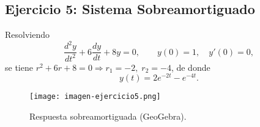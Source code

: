 \subsection{Ejercicio 5: Sistema Sobreamortiguado}
Resolviendo
\[
\frac{d^2y}{dt^2}+6\frac{dy}{dt}+8y=0,\qquad y(0)=1,\quad y'(0)=0,
\]
se tiene $r^2+6r+8=0\Rightarrow r_1=-2,\;r_2=-4$, de donde
\[
y(t)=2e^{-2t}-e^{-4t}.
\]
\begin{figure}[H]
\centering
\texttt{[image: imagen-ejercicio5.png]}
\caption{Respuesta sobreamortiguada (GeoGebra).}
\end{figure}